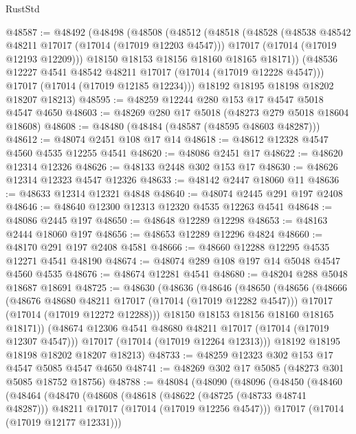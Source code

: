 \begin{lexlean}{RustStd}
\begin{coremodule}
{\begin{coremodule}
{{{{{{{{{{{{{{{{{{{{{{{{{{{{{{{{{{{{{{{{{{{{{{{{{{{{{{{@48587 := @48492
    (@48498
      (@48508
        (@48512
          (@48518
            (@48528
              (@48538 @48542 @48211 @17017 (@17014 (@17019 @12203 @4547)))
              @17017
              (@17014 (@17019 @12193 @12209)))
            @18150
            @18153
            @18156
            @18160
            @18165
            @18171))
        (@48536 @12227 @4541 @48542 @48211 @17017 (@17014 (@17019 @12228 @4547)))
        @17017
        (@17014 (@17019 @12185 @12234)))
      @18192
      @18195
      @18198
      @18202
      @18207
      @18213)
@48595 := @48259 @12244 @280 @153 @17 @4547 @5018 @4547 @4650
@48603 := @48269 @280 @17 @5018 (@48273 @279 @5018 @18604 @18608)
@48608 := @48480 (@48484 (@48587 (@48595 @48603 @48287)))
@48612 := @48074 @2451 @108 @17 @14
@48618 := @48612 @12328 @4547 @4560 @4535 @12255 @4541
@48620 := @48086 @2451 @17
@48622 := @48620 @12314 @12326
@48626 := @48133 @2448 @302 @153 @17
@48630 := @48626 @12314 @12323 @4547 @12326
@48633 := @48142 @2447 @18060 @11
@48636 := @48633 @12314 @12321 @4848
@48640 := @48074 @2445 @291 @197 @2408
@48646 := @48640 @12300 @12313 @12320 @4535 @12263 @4541
@48648 := @48086 @2445 @197
@48650 := @48648 @12289 @12298
@48653 := @48163 @2444 @18060 @197
@48656 := @48653 @12289 @12296 @4824
@48660 := @48170 @291 @197 @2408 @4581
@48666 := @48660 @12288 @12295 @4535 @12271 @4541 @48190
@48674 := @48074 @289 @108 @197 @14 @5048 @4547 @4560 @4535
@48676 := @48674 @12281 @4541
@48680 := @48204 @288 @5048 @18687 @18691
@48725 := @48630
    (@48636
      (@48646
        (@48650
          (@48656
            (@48666
              (@48676 @48680 @48211 @17017 (@17014 (@17019 @12282 @4547)))
              @17017
              (@17014 (@17019 @12272 @12288)))
            @18150
            @18153
            @18156
            @18160
            @18165
            @18171))
        (@48674 @12306 @4541 @48680 @48211 @17017 (@17014 (@17019 @12307 @4547)))
        @17017
        (@17014 (@17019 @12264 @12313)))
      @18192
      @18195
      @18198
      @18202
      @18207
      @18213)
@48733 := @48259 @12323 @302 @153 @17 @4547 @5085 @4547 @4650
@48741 := @48269 @302 @17 @5085 (@48273 @301 @5085 @18752 @18756)
@48788 := @48084
    (@48090
      (@48096
        (@48450
          (@48460
            (@48464
              (@48470
                (@48608
                  (@48618
                    (@48622 (@48725 (@48733 @48741 @48287)))
                    @48211
                    @17017
                    (@17014 (@17019 @12256 @4547)))
                  @17017
                  (@17014 (@17019 @12177 @12331)))
}}}}}}}}}}}}}}}}}}}}}}}}}}}}}}}}}}}}}}}}}}}}}}}}}}}}}}}
\end{coremodule}}
\end{coremodule}
\end{lexlean}
